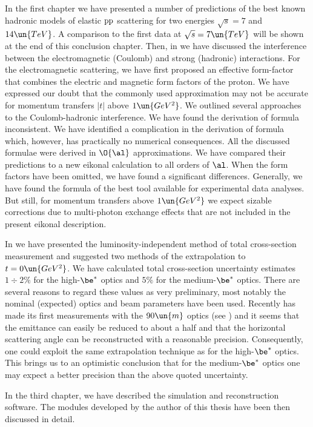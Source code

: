 In the first chapter we have presented a number of predictions of the best known hadronic models of elastic $\rm pp$ scattering for two  energies $\sqrt s = 7$ and $14\un{TeV}$. A comparison to the first  data at $\sqrt s = 7\un{TeV}$ will be shown at the end of this conclusion chapter. Then, in  we have discussed the interference between the electromagnetic (Coulomb) and strong (hadronic) interactions. For the electromagnetic scattering, we have first proposed an effective form-factor that combines the electric and magnetic form factors of the proton. We have expressed our doubt that the commonly used  approximation may not be accurate for momentum transfers $|t|$ above $1\un{GeV^2}$. We outlined several approaches to the Coulomb-hadronic interference. We have found the derivation of \WaY{} formula inconsistent. We have identified a complication in the derivation of \KaL{} formula which, however, has practically no numerical consequences. All the discussed formulae were derived in $\O{\al}$ approximations. We have compared their predictions to a new eikonal calculation to all orders of $\al$. When the form factors have been omitted, we have found a significant differences. Generally, we have found the formula of \KaL{} the best tool available for experimental data analyses. But still, for momentum transfers above $1\un{GeV^2}$ we expect sizable corrections due to multi-photon exchange effects that are not included in the present eikonal description.

In  we have presented the luminosity-independent method of total cross-section measurement and suggested two methods of the extrapolation to $t=0\un{GeV^2}$. We have calculated total cross-section uncertainty estimates $1\div2\percent$ for the high-$\be^*$ optics and $5\percent$ for the medium-$\be^*$ optics. There are several reasons to regard these values as very preliminary, most notably the nominal (expected) optics and beam parameters have been used. Recently  has made its first measurements with the $90\un{m}$ optics (see ) and it seems that the emittance can easily be reduced to about a half and that the horizontal scattering angle can be reconstructed with a reasonable precision. Consequently, one could exploit the same extrapolation technique as for the high-$\be^*$ optics. This brings us to an optimistic conclusion that for the medium-$\be^*$ optics one may expect a better precision than the above quoted uncertainty.

In the third chapter, we have described the  simulation and reconstruction software. The modules developed by the author of this thesis have been then discussed in detail.

